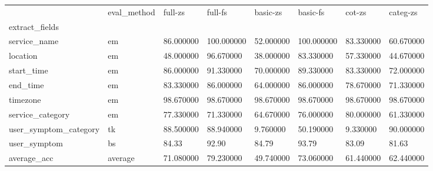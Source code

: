 \begin{tabular}{llllllll}
\toprule
 & eval_method & full-zs & full-fs & basic-zs & basic-fs & cot-zs & categ-zs \\
extract_fields &  &  &  &  &  &  &  \\
\midrule
service_name & em & 86.000000 & 100.000000 & 52.000000 & 100.000000 & 83.330000 & 60.670000 \\
location & em & 48.000000 & 96.670000 & 38.000000 & 83.330000 & 57.330000 & 44.670000 \\
start_time & em & 86.000000 & 91.330000 & 70.000000 & 89.330000 & 83.330000 & 72.000000 \\
end_time & em & 83.330000 & 86.000000 & 64.000000 & 86.000000 & 78.670000 & 71.330000 \\
timezone & em & 98.670000 & 98.670000 & 98.670000 & 98.670000 & 98.670000 & 98.670000 \\
service_category & em & 77.330000 & 71.330000 & 64.670000 & 76.000000 & 80.000000 & 61.330000 \\
user_symptom_category & tk & 88.500000 & 88.940000 & 9.760000 & 50.190000 & 9.330000 & 90.000000 \\
user_symptom & bs & 84.33 & 92.90 & 84.79 & 93.79 & 83.09 & 81.63 \\
average_acc & average & 71.080000 & 79.230000 & 49.740000 & 73.060000 & 61.440000 & 62.440000 \\
\bottomrule
\end{tabular}
